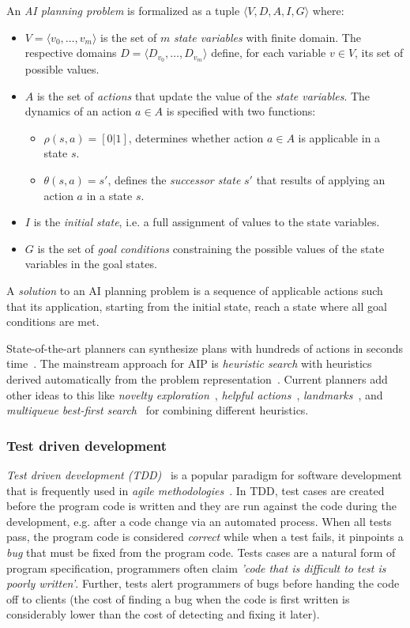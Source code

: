 \documentclass[10pt,a4paper]{paper}
\newcommand{\tup}[1]{{\langle #1 \rangle}}
\begin{document}
An {\em AI planning problem} is formalized as a tuple $\tup{V,D,A,I,G}$ where:
\begin{itemize}
\item $V=\tup{v_0, \ldots, v_m}$ is the set of $m$ {\em state variables} with finite domain. The respective domains $D=\tup{D_{v_0}, \ldots, D_{v_m}}$ define, for each variable $v\in V$, its set of possible values.
\item $A$ is the set of {\em actions} that update the value of the {\em state variables}. The dynamics of an action $a\in A$ is specified with two functions:
\begin{itemize}
\item $\rho(s,a)=[0|1]$, determines whether action $a\in A$ is applicable in a state $s$.
\item $\theta(s,a)=s'$, defines the {\em successor state} $s'$ that results of applying an action $a$ in a state $s$.
\end{itemize}  
\item $I$ is the {\em initial state}, i.e. a full assignment of values to the state variables.
\item $G$ is the set of {\em goal conditions} constraining the possible values of the state variables in the goal states.  
\end{itemize}
A {\em solution} to an AI planning problem is a sequence of applicable actions such that its application, starting from the initial state, reach a state where all goal conditions are met.

State-of-the-art planners can synthesize plans with hundreds of actions in seconds time~\cite{geffner2013concise}.  The mainstream approach for AIP is {\em heuristic search} with heuristics derived automatically from the problem representation~\cite{mcdermott1996heuristic,bonet2001planning}.  Current planners add other ideas to this like {\it novelty exploration}~\cite{geffner:psimulators:IJCAI17}, {\it helpful actions}~\cite{hoffmann2001ff}, {\it landmarks}~\cite{helmert2006fast}, and {\it multiqueue best-first search}~\cite{richter2010lama} for combining different heuristics.

\subsubsection{Test driven development}
{\em Test driven development (TDD)}~\cite{beck:TDD:2003} is a popular paradigm for software development that is frequently used in {\it agile methodologies}~\cite{cohen2003agile}. In TDD, test cases are created before the program code is written and they are run against the code during the development, e.g. after a code change via an automated process. When all tests pass, the program code is considered {\em correct} while when a test fails, it pinpoints a {\em bug} that must be fixed from the program code. Tests cases are a natural form of program specification, programmers often claim {\em 'code that is difficult to test is poorly written'}. Further, tests alert programmers of bugs before handing the code off to clients (the cost of finding a bug when the code is first written is considerably lower than the cost of detecting and fixing it later).
\end{document}
